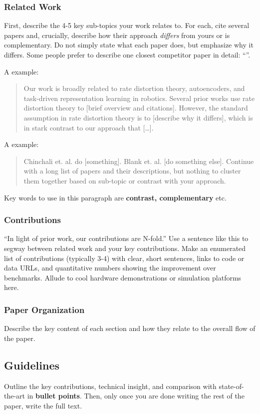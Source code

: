 \subsubsection{Related Work}
First, describe the 4-5 key sub-topics your work relates to. For each, cite several papers and, crucially, describe how their approach \textit{differs} from yours or is complementary. Do not simply state what each paper does, but emphasize why it differs. Some people prefer to describe one closest competitor paper in detail: ``''.

A  example:

\begin{quote}
    Our work is broadly related to rate distortion theory, autoencoders, and task-driven representation learning in robotics. Several prior works use rate distortion theory to [brief overview and citations]. However, the standard assumption in rate distortion theory is to [describe why it differs], which is in stark contrast to our approach that [\ldots].
\end{quote}

A  example:

\begin{quote}
Chinchali et. al. do [something]. Blank et. al. [do something else]. Continue with a long list of papers and their descriptions, but nothing to cluster them together based on sub-topic or contrast with your approach. 
\end{quote}

Key words to use in this paragraph are \textbf{contrast, complementary} etc.

\subsubsection{Contributions }
``In light of prior work, our contributions are N-fold.'' Use a sentence like this to segway between related work and your key contributions. Make an enumerated list of contributions (typically 3-4) with clear, short sentences, links to code or data URLs, and quantitative numbers showing the improvement over benchmarks. 
Allude to cool hardware demonstrations or simulation platforms here.

\subsubsection{Paper Organization }
Describe the key content of each section and how they relate to the overall flow of the paper.

\subsection{Guidelines}
Outline the key contributions, technical insight, and comparison with state-of-the-art in \textbf{bullet points}. Then, only once you are done writing the rest of the paper, write the full text.

